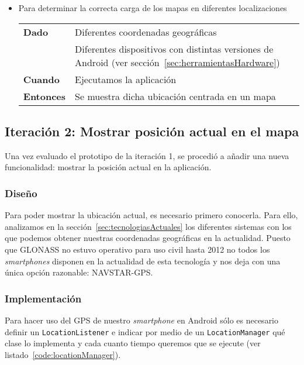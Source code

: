 \begin{itemize}
  \item Para determinar la correcta carga de los mapas en diferentes localizaciones

  \begin{tabular}{p{}p{}}
    \hline
    \textbf{Dado}     & Diferentes coordenadas geográficas \\
                      & Diferentes dispositivos con distintas versiones de Android (ver
                        sección~\ref{sec:herramientasHardware}) \\
    \textbf{Cuando}   & Ejecutamos la aplicación \\
    \textbf{Entonces} & Se muestra dicha ubicación centrada en un mapa \\
    \hline
  \end{tabular}
\end{itemize}

\subsection{Iteración 2: Mostrar posición actual en el mapa}
\label{sec:ite2}

Una vez evaluado el prototipo de la iteración 1, se procedió a añadir una nueva funcionalidad:
mostrar la posición actual en la aplicación.

\subsubsection{Diseño}

Para poder mostrar la ubicación actual, es necesario primero conocerla. Para ello, analizamos en la
sección~\ref{sec:tecnologiasActuales} los diferentes sistemas con los que podemos obtener nuestras
coordenadas geográficas en la actualidad. Puesto que \acs{GLONASS} no estuvo operativo para uso
civil hasta 2012 no todos los \emph{smartphones} disponen en la actualidad de esta tecnología y nos
deja con una única opción razonable: \acs{NAVSTAR-GPS}.

\subsubsection{Implementación}

Para hacer uso del \acs{GPS} de nuestro \emph{smartphone} en Android sólo es necesario definir un
\texttt{LocationListener} e indicar por medio de un \texttt{LocationManager} qué clase lo implementa
y cada cuanto tiempo queremos que se ejecute (ver listado~\ref{code:locationManager}).

